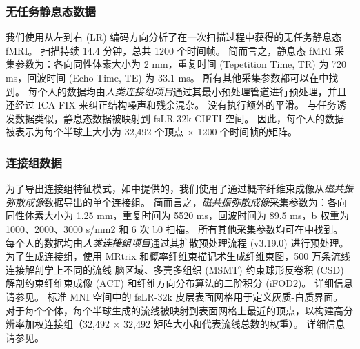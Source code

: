 \documentclass[lang=cn,a4paper,newtx,citestyle=gb7714-2015, bibstyle=gb7714-2015]{elegantpaper}
\begin{document}
\subsubsection{无任务静息态数据} \label{sec:sup_2_2}
我们使用从左到右 (LR) 编码方向分析了在一次扫描过程中获得的无任务静息态 fMRI。
扫描持续 14.4 分钟，总共 1200 个时间帧。
简而言之，静息态 fMRI 采集参数为：各向同性体素大小为 2 mm，重复时间 (Tepetition Time, TR) 为 720 ms，回波时间 (Echo Time, TE) 为 33.1 ms。
所有其他采集参数都可以在\cite{van2013wu}中找到。
每个人的数据均由\textit{人类连接组项目}通过其最小预处理管道进行预处理\cite{glasser2013minimal}，并且还经过 ICA-FIX 来纠正结构噪声和残余混杂\cite{salimi2014automatic}。
没有执行额外的平滑。
与任务诱发数据类似，静息态数据被映射到 fsLR-32k CIFTI 空间。
因此，每个人的数据被表示为每个半球上大小为 32,492 个顶点 × 1200 个时间帧的矩阵。


\subsubsection{连接组数据} \label{sec:sup_2_3}

为了导出连接组特征模式，如\cite{tian2021high}中提供的，我们使用了通过概率纤维束成像从\textit{磁共振弥散成像}数据导出的单个连接组。
简而言之，\textit{磁共振弥散成像}采集参数为：各向同性体素大小为 1.25 mm，重复时间为 5520 ms，回波时间为 89.5 ms，b 权重为 1000、2000、3000 s/mm2 和 6 次 b0 扫描。
所有其他采集参数均可在\cite{van2013wu}中找到。
每个人的数据均由\textit{人类连接组项目}通过其扩散预处理流程 (v3.19.0) \cite{glasser2013minimal}进行预处理。
为了生成连接组，使用 MRtrix 和概率纤维束描记术生成纤维束图，500 万条流线连接解剖学上不同的流线 脑区域、多壳多组织 (MSMT) 约束球形反卷积 (CSD) 解剖约束纤维束成像 (ACT) 和纤维方向分布算法的二阶积分 (iFOD2)。
详细信息请参见\cite{tian2021high}。
标准 MNI 空间中的 fsLR-32k 皮层表面网格用于定义灰质-白质界面。
对于每个个体，每个半球生成的流线被映射到表面网格上最近的顶点，以构建高分辨率加权连接组（32,492 × 32,492 矩阵大小和代表流线总数的权重）。
详细信息请参见\cite{tian2021high}。
\end{document}
